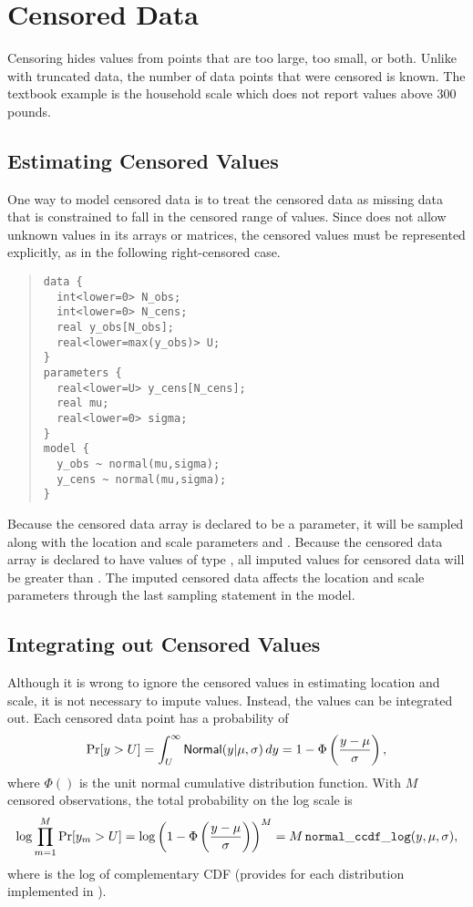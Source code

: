 \section{Censored Data}

Censoring hides values from points that are too large, too small, or
both.  Unlike with truncated data, the number of data points that were
censored is known.  The textbook example is the household scale which
does not report values above 300 pounds.  

\subsection{Estimating Censored Values}

One way to model censored data is to treat the censored data as
missing data that is constrained to fall in the censored range of
values.  Since \Stan does not allow unknown values in its arrays or
matrices, the censored values must be represented explicitly, as in the
following right-censored case.
%
\begin{quote}
\begin{Verbatim}[fontsize=\small]
data {
  int<lower=0> N_obs;
  int<lower=0> N_cens;
  real y_obs[N_obs];
  real<lower=max(y_obs)> U;
}
parameters {
  real<lower=U> y_cens[N_cens];
  real mu;
  real<lower=0> sigma;
}
model {
  y_obs ~ normal(mu,sigma);
  y_cens ~ normal(mu,sigma);
}
\end{Verbatim}
\end{quote}
%
Because the censored data array  is declared to be a parameter, it
will be sampled along with the location and scale parameters 
and .  Because the censored data array  is
declared to have values of type , all imputed values
for censored data will be greater than .  The imputed censored
data affects the location and scale parameters through the last
sampling statement in the model.  

\subsection{Integrating out Censored Values}

Although it is wrong to ignore the censored values in estimating
location and scale, it is not necessary to impute values.  Instead,
the values can be integrated out.  Each censored data point has a
probability of
%
\[
\mbox{Pr}[y > U] 
= \int_U^{\infty} \mbox{\sf Normal}(y|\mu,\sigma) \, dy
= 1 - \Phi\left(\frac{y - \mu}{\sigma}\right),
\]
%
where $\Phi()$ is the unit normal cumulative distribution function.
With $M$ censored observations, the total probability on the log scale
is
\[
\log \prod_{m=1}^M \mbox{Pr}[y_m > U]
= \log \left( 1 - \Phi\left(\frac{y - \mu}{\sigma}\right)\right)^{M}
= M \, {\tt normal\_ccdf\_log}(y,\mu,\sigma),
\]
%
where  is the log of complementary CDF
(\Stan provides  for each distribution
implemented in \Stan).

